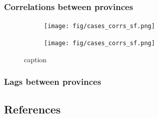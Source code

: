 \documentclass[
]{article}
\begin{document}
\hypertarget{correlations-between-provinces}{%
\subsubsection{Correlations between
provinces}\label{correlations-between-provinces}}

\begin{figure}[h]
\begin{subfigure}{.5\textwidth}
\texttt{[image: fig/cases\_corrs\_sf.png]}
\end{subfigure}%
\begin{subfigure}{.5\textwidth}
\texttt{[image: fig/cases\_corrs\_sf.png]}
\end{subfigure}
\caption{caption}
\end{figure}

\hypertarget{lags-between-provinces}{%
\subsubsection{Lags between provinces}\label{lags-between-provinces}}

\hypertarget{references}{%
\subsection{References}\label{references}}
\end{document}
